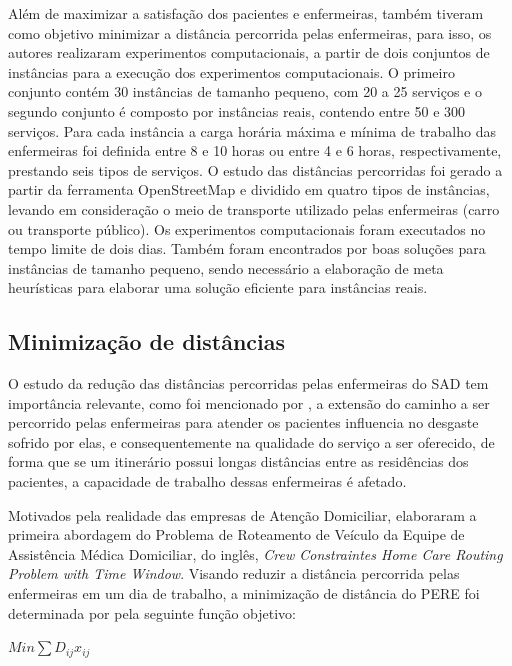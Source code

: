 Além de maximizar a satisfação dos pacientes e enfermeiras,  também tiveram como objetivo minimizar a distância percorrida pelas enfermeiras, para isso, os autores realizaram experimentos computacionais, a partir de dois conjuntos de instâncias para a execução dos experimentos computacionais. 
O primeiro conjunto contém 30 instâncias de tamanho pequeno, com 20 a 25 serviços e o segundo conjunto é composto por instâncias reais, contendo entre 50 e 300 serviços. 
Para cada instância a carga horária máxima e mínima de trabalho das enfermeiras foi definida entre 8 e 10 horas ou entre 4 e 6 horas, respectivamente, prestando seis tipos de serviços.
O estudo das distâncias percorridas foi gerado a partir da ferramenta OpenStreetMap e dividido em quatro tipos de instâncias, levando em consideração o meio de transporte utilizado pelas enfermeiras (carro ou transporte público). Os experimentos computacionais foram executados no tempo limite de dois dias. Também foram encontrados por  boas soluções para instâncias de tamanho pequeno, sendo necessário a elaboração de meta heurísticas para elaborar uma solução eficiente para instâncias reais. 

\subsection{Minimização de distâncias}

O estudo da redução das distâncias percorridas pelas enfermeiras do \ac{SAD} tem importância relevante, como foi mencionado por , a extensão do caminho a ser percorrido pelas enfermeiras para atender os pacientes influencia no desgaste sofrido por elas, e consequentemente na qualidade do serviço a ser oferecido, de forma que se um itinerário possui longas distâncias entre as residências dos pacientes, a capacidade de trabalho dessas enfermeiras é afetado.

Motivados pela realidade das empresas de Atenção Domiciliar,  elaboraram a primeira abordagem do Problema de Roteamento de Veículo da Equipe de Assistência Médica Domiciliar, do inglês, \textit{Crew Constraintes Home Care Routing Problem with Time Window}.
Visando reduzir a distância percorrida pelas enfermeiras em um dia de trabalho, a minimização de distância do \ac{PERE} foi determinada por  pela seguinte função objetivo:  

\begin{center}
$Min \sum D_{ij}x_{ij}$
\end{center}

